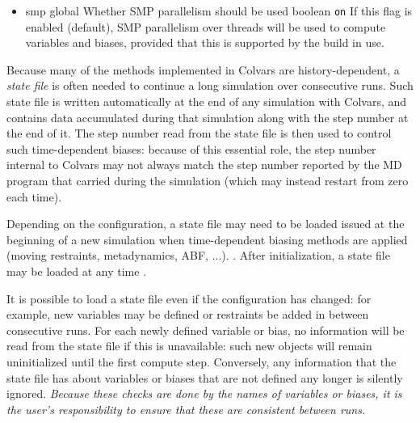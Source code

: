 \begin{itemize}
\item %
  \keydef
    {smp}{%
    global}{%
    Whether SMP parallelism should be used}{%
    boolean}{%
    \texttt{on}}{%
    If this flag is enabled (default), SMP parallelism over threads will be used to compute variables and biases, provided that this is supported by the \MDENGINE{} build in use.}

\end{itemize}



Because many of the methods implemented in Colvars are history-dependent, a \emph{state file} is often needed to continue a long simulation over consecutive runs.
Such state file is written automatically at the end of any simulation with Colvars, and contains data accumulated during that simulation along with the step number at the end of it.
The step number read from the state file is then used to control such time-dependent biases: because of this essential role, the step number internal to Colvars may not always match the step number reported by the MD program that carried during the simulation (which may instead restart from zero each time).

Depending on the configuration, a state file may need to be loaded issued at the beginning of a new simulation when time-dependent biasing methods are applied (moving restraints, metadynamics, ABF, ...).
.
After initialization, a state file may be loaded at any time %
%
.

It is possible to load a state file even if the configuration has changed:
for example, new variables may be defined or restraints be added in between consecutive runs.
For each newly defined variable or bias, no information will be read from the state file if this is unavailable: such new objects will remain uninitialized until the first compute step.
Conversely, any information that the state file has about variables or biases that are not defined any longer is silently ignored.
\emph{Because these checks are done by the names of variables or biases, it is the user's responsibility to ensure that these are consistent between runs.}



